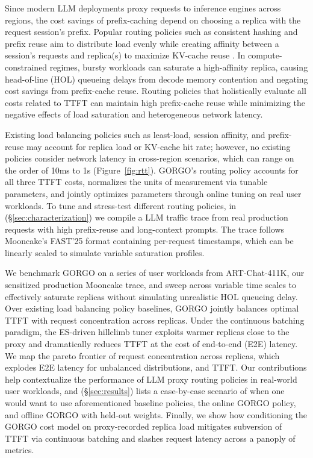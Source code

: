 \documentclass{article}
\begin{document}
Since modern LLM deployments proxy requests to inference engines across regions, the cost savings of prefix-caching depend on choosing a replica with the request session's prefix. Popular routing policies such as consistent hashing and prefix reuse aim to distribute load evenly while creating affinity between a session's requests and replica(s) to maximize KV-cache reuse \citep{karger1997consistent, chord2003, sglang2024, skywalker}. In compute-constrained regimes, bursty workloads can saturate a high-affinity replica, causing head-of-line (HOL) queueing delays from decode memory contention and negating cost savings from prefix-cache reuse. Routing policies that holistically evaluate all costs related to TTFT can maintain high prefix-cache reuse while minimizing the negative effects of load saturation and heterogeneous network latency.

Existing load balancing policies such as least-load, session affinity, and prefix-reuse may account for replica load or KV-cache hit rate; however, no existing policies consider network latency in cross-region scenarios, which can range on the order of 10ms to 1s (Figure~\ref{fig:rtt}). GORGO's routing policy accounts for all three TTFT costs, normalizes the units of measurement via tunable parameters, and jointly optimizes parameters through online tuning on real user workloads. To tune and stress-test different routing policies, in (\S\ref{sec:characterization}) we compile a LLM traffic trace from real production requests with high prefix-reuse and long-context prompts. The trace follows Mooncake's FAST'25 format \citep{qin2024mooncake} containing per-request timestamps, which can be linearly scaled to simulate variable saturation profiles.

We benchmark GORGO on a series of user workloads from ART-Chat-411K, our sensitized production Mooncake trace, and sweep across variable time scales to effectively saturate replicas without simulating unrealistic HOL queueing delay. Over existing load balancing policy baselines, GORGO jointly balances optimal TTFT with request concentration across replicas. Under the continuous batching paradigm, the ES-driven hillclimb tuner exploits warmer replicas close to the proxy and dramatically reduces TTFT at the cost of end-to-end (E2E) latency. We map the pareto frontier of request concentration across replicas, which explodes E2E latency for unbalanced distributions, and TTFT. Our contributions help contextualize the performance of LLM proxy routing policies in real-world user workloads, and (\S\ref{sec:results}) lists a case-by-case scenario of when one would want to use aforementioned baseline policies, the online GORGO policy, and offline GORGO with held-out weights. Finally, we show how conditioning the GORGO cost model on proxy-recorded replica load mitigates subversion of TTFT via continuous batching and slashes request latency across a panoply of metrics.
\end{document}
